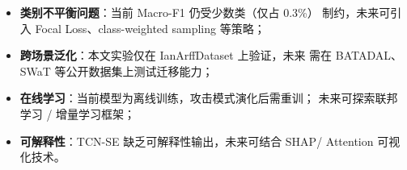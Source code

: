 \begin{itemize}
  \item \textbf{类别不平衡问题}：当前 Macro-F1 仍受少数类（仅占 0.3\%）
        制约，未来可引入 Focal Loss、class-weighted sampling 等策略；
  \item \textbf{跨场景泛化}：本文实验仅在 IanArffDataset 上验证，未来
        需在 BATADAL、SWaT 等公开数据集上测试迁移能力；
  \item \textbf{在线学习}：当前模型为离线训练，攻击模式演化后需重训；
        未来可探索联邦学习 / 增量学习框架；
  \item \textbf{可解释性}：TCN-SE 缺乏可解释性输出，未来可结合 SHAP/
        Attention 可视化技术。
\end{itemize}
